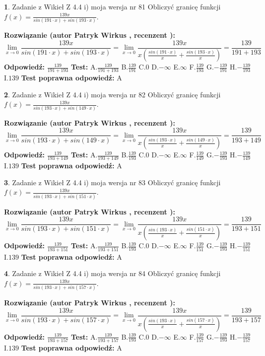\documentclass[12pt, a4paper]{article}
\theoremstyle{definition} %
\newtheorem{zad}{}
\newcommand{\zadStart}[1]{\begin{zad}#1\newline}
\newcommand{\zadStop}{\end{zad}}
\newcommand{\rozwStart}[2]{\noindent \textbf{Rozwiązanie (autor #1 , recenzent #2): }\newline}
\newcommand{\rozwStop}{\newline}
\newcommand{\odpStart}{\noindent \textbf{Odpowiedź:}\newline}
\newcommand{\odpStop}{\newline}
\newcommand{\testStart}{\noindent \textbf{Test:}\newline}
\newcommand{\testStop}{\newline}
\newcommand{\kluczStart}{\noindent \textbf{Test poprawna odpowiedź:}\newline}
\newcommand{\kluczStop}{\newline}
\begin{document}
\zadStart{Zadanie z Wikieł Z 4.4 i) moja wersja nr 81}
Obliczyć granicę funkcji $f(x)=\frac{139x}{sin(191\cdot x) +sin(193\cdot x)}$.
\zadStop
\rozwStart{Patryk Wirkus}{}
$$\lim\limits_{x\to 0}\frac{139x}{sin(191\cdot x) +sin(193\cdot x)}=\lim\limits_{x\to 0}\frac{139x}{x(\frac{sin(191\cdot x)}{x}+\frac{sin(193\cdot x)}{x})}=\frac{139}{191+193}$$
\rozwStop
\odpStart
$\frac{139}{191+193}$
\odpStop
\testStart
A.$\frac{139}{191+193}$
B.$\frac{139}{191}$
C.$0$
D.$-\infty$
E.$\infty$
F.$\frac{139}{193}$
G.$-\frac{139}{191}$
H.$-\frac{139}{193}$
I.$139$
\testStop
\kluczStart
A
\kluczStop



\zadStart{Zadanie z Wikieł Z 4.4 i) moja wersja nr 82}
Obliczyć granicę funkcji $f(x)=\frac{139x}{sin(193\cdot x) +sin(149\cdot x)}$.
\zadStop
\rozwStart{Patryk Wirkus}{}
$$\lim\limits_{x\to 0}\frac{139x}{sin(193\cdot x) +sin(149\cdot x)}=\lim\limits_{x\to 0}\frac{139x}{x(\frac{sin(193\cdot x)}{x}+\frac{sin(149\cdot x)}{x})}=\frac{139}{193+149}$$
\rozwStop
\odpStart
$\frac{139}{193+149}$
\odpStop
\testStart
A.$\frac{139}{193+149}$
B.$\frac{139}{193}$
C.$0$
D.$-\infty$
E.$\infty$
F.$\frac{139}{149}$
G.$-\frac{139}{193}$
H.$-\frac{139}{149}$
I.$139$
\testStop
\kluczStart
A
\kluczStop



\zadStart{Zadanie z Wikieł Z 4.4 i) moja wersja nr 83}
Obliczyć granicę funkcji $f(x)=\frac{139x}{sin(193\cdot x) +sin(151\cdot x)}$.
\zadStop
\rozwStart{Patryk Wirkus}{}
$$\lim\limits_{x\to 0}\frac{139x}{sin(193\cdot x) +sin(151\cdot x)}=\lim\limits_{x\to 0}\frac{139x}{x(\frac{sin(193\cdot x)}{x}+\frac{sin(151\cdot x)}{x})}=\frac{139}{193+151}$$
\rozwStop
\odpStart
$\frac{139}{193+151}$
\odpStop
\testStart
A.$\frac{139}{193+151}$
B.$\frac{139}{193}$
C.$0$
D.$-\infty$
E.$\infty$
F.$\frac{139}{151}$
G.$-\frac{139}{193}$
H.$-\frac{139}{151}$
I.$139$
\testStop
\kluczStart
A
\kluczStop



\zadStart{Zadanie z Wikieł Z 4.4 i) moja wersja nr 84}
Obliczyć granicę funkcji $f(x)=\frac{139x}{sin(193\cdot x) +sin(157\cdot x)}$.
\zadStop
\rozwStart{Patryk Wirkus}{}
$$\lim\limits_{x\to 0}\frac{139x}{sin(193\cdot x) +sin(157\cdot x)}=\lim\limits_{x\to 0}\frac{139x}{x(\frac{sin(193\cdot x)}{x}+\frac{sin(157\cdot x)}{x})}=\frac{139}{193+157}$$
\rozwStop
\odpStart
$\frac{139}{193+157}$
\odpStop
\testStart
A.$\frac{139}{193+157}$
B.$\frac{139}{193}$
C.$0$
D.$-\infty$
E.$\infty$
F.$\frac{139}{157}$
G.$-\frac{139}{193}$
H.$-\frac{139}{157}$
I.$139$
\testStop
\kluczStart
A
\kluczStop
\end{document}
